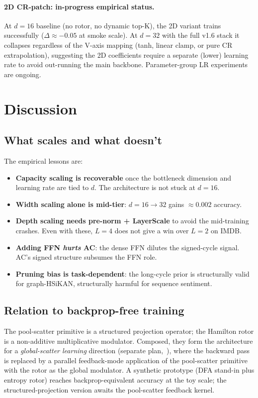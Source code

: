 \documentclass[10pt,a4paper]{article}
\begin{document}
\paragraph{2D CR-patch: in-progress empirical status.}
At $d = 16$ baseline (no rotor, no dynamic top-K), the 2D variant
trains successfully ($\Delta \approx -0.05$ at smoke scale). At
$d = 32$ with the full v1.6 stack it collapses regardless of the V-axis
mapping (tanh, linear clamp, or pure CR extrapolation), suggesting the
2D coefficients require a separate (lower) learning rate to avoid
out-running the main backbone. Parameter-group LR experiments are
ongoing.

\section{Discussion}

\subsection{What scales and what doesn't}

The empirical lessons are:
\begin{itemize}[noitemsep]
\item \textbf{Capacity scaling is recoverable} once the bottleneck
      dimension and learning rate are tied to $d$. The architecture is
      not stuck at $d = 16$.
\item \textbf{Width scaling alone is mid-tier}: $d = 16 \to 32$ gains
      $\approx 0.002$ accuracy.
\item \textbf{Depth scaling needs pre-norm + LayerScale} to avoid the
      mid-training crashes. Even with these, $L = 4$ does not give a
      win over $L = 2$ on IMDB.
\item \textbf{Adding FFN \emph{hurts} AC}: the dense FFN dilutes the
      signed-cycle signal. AC's signed structure subsumes the FFN
      role.
\item \textbf{Pruning bias is task-dependent}: the long-cycle prior is
      structurally valid for graph-HSiKAN, structurally harmful for
      sequence sentiment.
\end{itemize}

\subsection{Relation to backprop-free training}

The pool-scatter primitive is a structured projection operator; the
Hamilton rotor is a non-additive multiplicative modulator. Composed,
they form the architecture for a \emph{global-scatter learning}
direction (separate plan,~\cite{global-scatter-plan}), where the
backward pass is replaced by a parallel feedback-mode application of
the pool-scatter primitive with the rotor as the global modulator. A
synthetic prototype (DFA stand-in plus entropy rotor) reaches
backprop-equivalent accuracy at the toy scale; the structured-projection
version awaits the pool-scatter feedback kernel.
\end{document}
